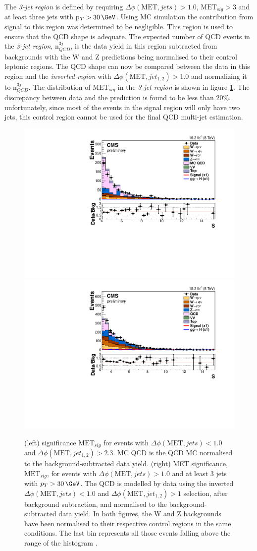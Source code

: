 The \textit{3-jet region} is defined by requiring $\Delta\phi(\text{MET},jets)>1.0$, $\text{MET}_{sig}>3$ and at least three jets with p$_{T}>30\,\GeV$. Using \gls{MC} simulation the contribution from signal to this region was determined to be negligible. This region is used to ensure that the \gls{QCD} shape is adequate. The expected number of \gls{QCD} events in the \textit{3-jet region}, n$_{QCD}^{3j}$, is the data yield in this region subtracted from backgrounds with the W and Z predictions being normalised to their control leptonic regions. The \gls{QCD} shape can now be compared between the data in this region and the \textit{inverted region} with $\Delta\phi(\text{MET},jet_{1,2})>1.0$ and normalizing it to n$_{QCD}^{3j}$. The distribution of $\text{MET}_{sig}$ in the \textit{3-jet region} is shown in figure \ref{FIGURE:ParkedDataAnalysis_QCDBackground_Plots}. The discrepancy between data and the prediction is found to be less than 20\%. unfortunately, since most of the events in the signal region will only have two jets, this control region cannot be used for the final \gls{QCD} multi-jet estimation.

\begin{figure}[!htb]
\centering
\includegraphics[width=.45\textwidth]{Chapter07/Images/output_invqcd_qcd_metnomu_significance.pdf}
\includegraphics[width=.45\textwidth]{Chapter07/Images/output_invqcd_3j_nunu_metnomu_significance.pdf}
\caption{(left) \MET significance $\text{MET}_{sig}$ for events with $\Delta\phi(\text{MET},jets)<1.0$ and $\Delta\phi(\text{MET},jet_{1,2})>2.3$. MC QCD is the \gls{QCD} \gls{MC} normalised to the background-subtracted data yield. (right) \gls{MET} significance, $\text{MET}_{sig}$, for events with $\Delta\phi(\text{MET},jets)>1.0$ and at least 3 jets with $p_T>30\,\GeV$. The \gls{QCD} is modelled by data using the inverted $\Delta\phi(\text{MET},jets)<1.0$ and $\Delta\phi(\text{MET},jet_{1,2})>1$ selection, after background subtraction, and normalised to the background-subtracted data yield. In both figures, the W and Z backgrounds have been normalised to their respective control regions in the same conditions. The last bin represents all those events falling above the range of the histogram \cite{ARTICLE:CMSVBFHiggsInvisibleParkedAnalysisPAS}.}
\label{FIGURE:ParkedDataAnalysis_QCDBackground_Plots}
\end{figure}

